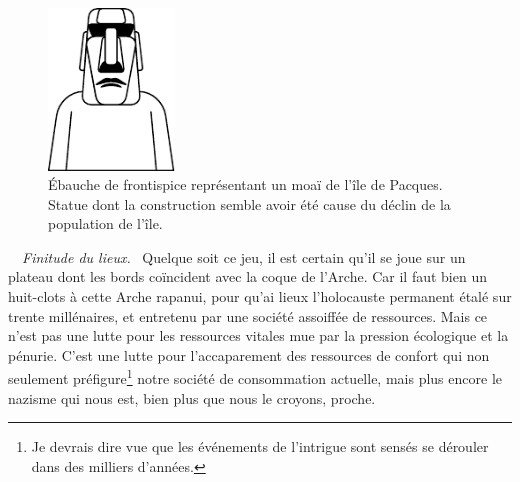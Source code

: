 \begin{figure}
	\vspace{-1em} %
	\centering
	\includegraphics[width=0.3\textwidth]{frontispice-moai.pdf}
	\caption{Ébauche de frontispice représentant un moaï de l’île de Pacques. Statue dont la construction semble avoir été cause du déclin de la population de l’île.}
	\vspace{-4em} %
	\vspace{1em} %
\end{figure}
\
\
{\em\normalsize Finitude du lieux.}~
Quelque soit ce jeu, il est certain qu’il se joue sur un plateau dont les bords coïncident avec la coque de l’Arche. Car il faut bien un huit-clots à cette Arche rapanui, pour qu’ai  lieux  l’holocauste permanent étalé sur trente millénaires, et entretenu par une société assoiffée de ressources. Mais ce n’est pas une lutte pour les ressources vitales mue par la pression écologique et la pénurie. C’est une lutte pour l’accaparement des ressources de confort qui non seulement préfigure\footnote{Je devrais dire  vue que les événements de l’intrigue sont sensés se dérouler dans des milliers d’années.} notre société de consommation actuelle, mais plus encore  le nazisme qui nous est, bien plus que nous le croyons, proche.

